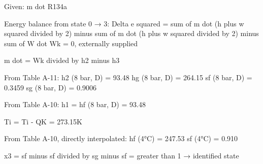 Given: m dot R134a  

Energy balance from state 0 → 3:  
Delta e squared = sum of m dot (h plus w squared divided by 2) minus sum of m dot (h plus w squared divided by 2) minus sum of W dot  
Wk = 0, externally supplied  

m dot = Wk divided by h2 minus h3  

From Table A-11:  
h2 (8 bar, D) = 93.48  
hg (8 bar, D) = 264.15  
sf (8 bar, D) = 0.3459  
sg (8 bar, D) = 0.9006  

From Table A-10:  
h1 = hf (8 bar, D) = 93.48  

Ti = Ti - QK = 273.15K  

From Table A-10, directly interpolated:  
hf (4°C) = 247.53  
sf (4°C) = 0.910  

x3 = sf minus sf divided by sg minus sf = greater than 1 → identified state